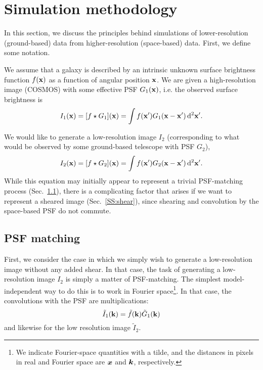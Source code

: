 \documentclass[twocolumn,useAMS,usenatbib]{mn2e}
\newcommand{\beq}{\begin{equation}}
\newcommand{\eeq}{\end{equation}}
\newcommand{\rmd}{\mathrm{d}}
\begin{document}
\section{Simulation methodology}\label{S:methodology}

In this section, we discuss the principles behind simulations of
lower-resolution (ground-based) data from higher-resolution
(space-based) data.  First, we define some notation.

We assume that a galaxy is described by an intrinsic unknown surface brightness function $f({\bf x})$ as a function of angular position ${\bf x}$.
We are given a high-resolution image (COSMOS) with some effective PSF $G_1({\bf x})$, i.e. the observed surface brightness is
\beq\label{E:highresim}
I_1({\bf x}) = [f\star G_1]({\bf x}) = \int f({\bf x}')G_1({\bf x}-{\bf x}')\,\rmd^2{\bf x}'.
\eeq

We would like to generate a low-resolution image $I_2$ (corresponding to
what would be observed by some ground-based telescope with PSF $G_2$),
\beq\label{E:lowresim}
I_2({\bf x}) = [f\star G_2]({\bf x}) = \int f({\bf x}')G_2({\bf
  x}-{\bf x}')\, \rmd^2{\bf x}'.
\eeq
While this equation may initially appear to represent a trivial
PSF-matching process (Sec.~\ref{SS:psfmatching}), there is a
complicating factor that arises if we want to represent a sheared
image (Sec.~\ref{SS:shear}), since shearing and convolution by the
space-based PSF do not commute.

\subsection{PSF matching}\label{SS:psfmatching}

First, we consider the case in which we simply wish to generate a
low-resolution image without any added shear.  In that case, the
task of generating a low-resolution image $I_2$ is simply a matter of
PSF-matching.  The simplest model-independent way to do this is to
work in Fourier space\footnote{We indicate 
Fourier-space quantities with a tilde, and the distances
in pixels in real and Fourier space are ${\bmath x}$ and ${\bmath k}$,
respectively.}. 
In that case, the convolutions with the PSF are multiplications:
\beq
\tilde{I}_1({\bf k}) = \tilde{f}({\bf k}) \tilde{G}_1({\bf k})
\eeq
and likewise for the low resolution image $\tilde{I}_2$.
\end{document}
